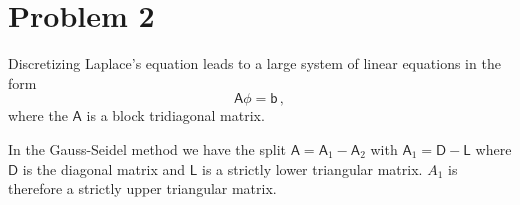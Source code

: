 \documentclass[11pt]{article}
\newcommand{\com}{\, ,}
\def\beq{\begin{equation}}
\def\eeq{\end{equation}}
\begin{document}
\begin{enumerate}[label=(\alph*)]
\end{enumerate}        

\section*{Problem 2}


    Discretizing Laplace's equation leads to a large system of linear equations in the form
    \beq
        \label{lap_eqn}
        \mathsf{A}\mathsf{\phi} = \mathsf{b}\com
    \eeq
    where the $\mathsf{A}$ is a block tridiagonal matrix.  

    In the Gauss-Seidel method we have the split $\mathsf{A} = \mathsf{A}_1 - \mathsf{A}_2$ with $\mathsf{A}_1 = \mathsf{D} -\mathsf{L}$ where $\mathsf{D}$ is the diagonal matrix and $\mathsf{L}$ is a strictly lower triangular matrix. $A_1$ is therefore a strictly upper triangular matrix. 
\end{document}
